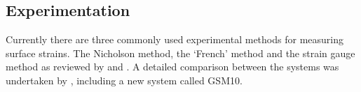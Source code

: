 \subsection{Experimentation}
Currently there are three commonly used experimental methods for measuring
surface strains. The Nicholson method, the `French' method and the strain
gauge method as reviewed by \cite{Murphy_2005}\cite{Yoshida_2002} and \cite{yang2005measurement}. A detailed comparison between the systems was undertaken by \cite{kamarudin2014new}, including a new system called GSM10.  